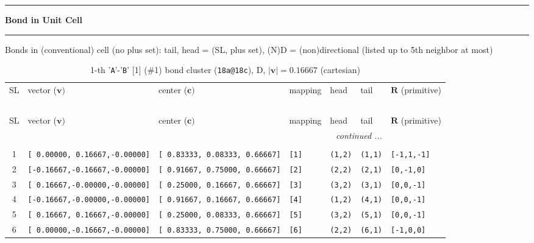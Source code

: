 \documentclass[fleqn,10pt,landscape]{jsarticle}
\begin{document}
\vspace{5mm}
\noindent \rule[0.5mm]{5mm}{0.5mm}\hspace{3mm}\textbf{Bond in Unit Cell}\hspace{3mm}\leaders\hrule height 0.5mm\hfill\kern0pt
\vspace{3mm}

\noindent Bonds in (conventional) cell (no plus set): tail, head = (SL, plus set), (N)D = (non)directional (listed up to 5th neighbor at most)

\renewcommand{\arraystretch}{1.6}
\begin{longtable}[l]{cllllll}
\captionsetup{justification=raggedright, singlelinecheck=off}
\caption{1-th '\texttt{A}'-'\texttt{B}' [1] (\#1) bond cluster (\texttt{18a@18c}), D, $|\bm{v}|=0.16667$ (cartesian)}
 \\
 \hline \hline
SL & vector ($\bm{v})$ & center ($\bm{c})$ & mapping & head & tail & $\bm{R}$ (primitive) \\ \hline \endfirsthead

\multicolumn{6}{l}{\tablename\ \thetable{}} \\
 \hline \hline
SL & vector ($\bm{v})$ & center ($\bm{c})$ & mapping & head & tail & $\bm{R}$ (primitive) \\ \hline \endhead

 \hline \hline
\multicolumn{6}{r}{\footnotesize\it continued ...} \\ \endfoot

 \hline \hline
\multicolumn{6}{r}{} \\ \endlastfoot

1 & \texttt{[ 0.00000, 0.16667,-0.00000]} & \texttt{[ 0.83333, 0.08333, 0.66667]} & \texttt{[1]} & \texttt{(1,2)} & \texttt{(1,1)} & \texttt{[-1,1,-1]} \\ \hline
2 & \texttt{[-0.16667,-0.16667,-0.00000]} & \texttt{[ 0.91667, 0.75000, 0.66667]} & \texttt{[2]} & \texttt{(2,2)} & \texttt{(2,1)} & \texttt{[0,-1,0]} \\ \hline
3 & \texttt{[ 0.16667,-0.00000,-0.00000]} & \texttt{[ 0.25000, 0.16667, 0.66667]} & \texttt{[3]} & \texttt{(3,2)} & \texttt{(3,1)} & \texttt{[0,0,-1]} \\ \hline
4 & \texttt{[-0.16667,-0.00000,-0.00000]} & \texttt{[ 0.91667, 0.16667, 0.66667]} & \texttt{[4]} & \texttt{(1,2)} & \texttt{(4,1)} & \texttt{[0,0,-1]} \\ \hline
5 & \texttt{[ 0.16667, 0.16667,-0.00000]} & \texttt{[ 0.25000, 0.08333, 0.66667]} & \texttt{[5]} & \texttt{(3,2)} & \texttt{(5,1)} & \texttt{[0,0,-1]} \\ \hline
6 & \texttt{[ 0.00000,-0.16667,-0.00000]} & \texttt{[ 0.83333, 0.75000, 0.66667]} & \texttt{[6]} & \texttt{(2,2)} & \texttt{(6,1)} & \texttt{[-1,0,0]} \\
\end{longtable}
\end{document}
